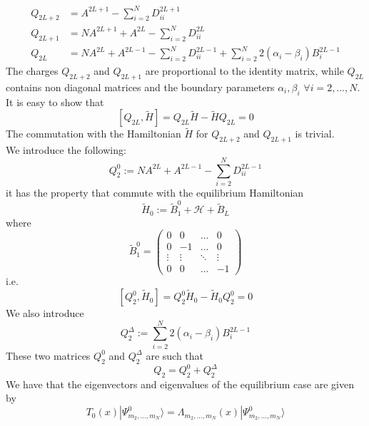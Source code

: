 \documentclass[11pt]{article}
\numberwithin{equation}{subsection}
\begin{document}
\begin{align}
	Q_{2L+2}&=A^{2L+1}-\sum_{i=2}^{N}D_{ii}^{2L+1}\\
	Q_{2L+1}&=NA^{2L+1}+A^{2L}-\sum_{i=2}^{N}D_{ii}^{2L}\\
	Q_{2L\phantom{+}}&=NA^{2L}+A^{2L-1}-\sum_{i=2}^{N}D_{ii}^{2L-1}+\sum_{i=2}^{N}2(\alpha_{i}-\beta_{i})B_{i}^{2L-1}
\end{align}
The charges $Q_{2L+2}$ and $Q_{2L+1}$ are proportional to the identity matrix, while $Q_{2L}$ contains non diagonal matrices and the boundary parameters $\alpha_{i},\beta_{i}$ $\forall i=2,\ldots,N$.\\
It is easy to show that 
\begin{equation}
	\left[Q_{2L},\widetilde{H}\right]=Q_{2L}\widetilde{H}-\widetilde{H}Q_{2L}=0
\end{equation}
The commutation with the Hamiltonian $\widetilde{H}$ for $Q_{2L+2}$ and $Q_{2L+1}$ is trivial. \\
We introduce the following:
\begin{equation}
Q_{2}^{0}:=NA^{2L}+A^{2L-1}-\sum_{i=2}^{N}D_{ii}^{2L-1}
\end{equation}
it has the property that commute with the equilibrium Hamiltonian
\begin{equation}
\widetilde{H}_{0}:=\widetilde{B}_{1}^{0}+\mathcal{H}+\widetilde{B}_{L}
\end{equation}
where 
\begin{equation}
\widetilde{B}_{1}^{0}=\begin{pmatrix}
0&0&\ldots&0\\
0&-1&\ldots&0\\
\vdots&\vdots&\ddots&\vdots\\
0&0&\ldots&-1
\end{pmatrix}
\end{equation}
i.e.
\begin{equation}
\left[Q_{2}^{0},\widetilde{H}_{0}\right]=Q_{2}^{0}\widetilde{H}_{0}-\widetilde{H}_{0}Q_{2}^{0}=0
\end{equation}
We also introduce 
\begin{equation}
Q_{2}^{\Delta}:=\sum_{i=2}^{N}2(\alpha_{i}-\beta_{i})B_{i}^{2L-1}
\end{equation}
These two matrices $Q_{2}^{0}$ and $Q_{2}^{\Delta}$ are such that
\begin{equation}
Q_{2}=Q_{2}^{0}+Q_{2}^{\Delta}
\end{equation}
We have that the eigenvectors and eigenvalues of the equilibrium case are given by
\begin{equation}
T_{0}(x)|\Psi_{m_{2},\ldots,m_{N}}^{0}\rangle =\Lambda_{m_{2},\ldots,m_{N}}(x)|\Psi_{m_{2},\ldots,m_{N}}^{0}\rangle
\end{equation}
\end{document}
